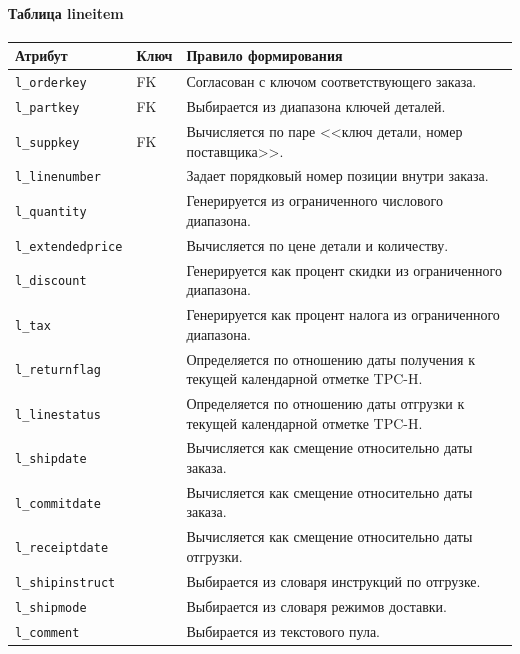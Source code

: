 \paragraph{Таблица lineitem}
\begin{center}
\small
\begin{tabular}{|p{}|p{}|p{}|}
\hline
\textbf{Атрибут} & \textbf{Ключ} & \textbf{Правило формирования} \\
\hline
\texttt{l\_orderkey} & FK & Согласован с ключом соответствующего заказа. \\
\hline
\texttt{l\_partkey} & FK & Выбирается из диапазона ключей деталей. \\
\hline
\texttt{l\_suppkey} & FK & Вычисляется по паре <<ключ детали, номер поставщика>>. \\
\hline
\texttt{l\_linenumber} &  & Задает порядковый номер позиции внутри заказа. \\
\hline
\texttt{l\_quantity} &  & Генерируется из ограниченного числового диапазона. \\
\hline
\texttt{l\_extendedprice} &  & Вычисляется по цене детали и количеству. \\
\hline
\texttt{l\_discount} &  & Генерируется как процент скидки из ограниченного диапазона. \\
\hline
\texttt{l\_tax} &  & Генерируется как процент налога из ограниченного диапазона. \\
\hline
\texttt{l\_returnflag} &  & Определяется по отношению даты получения к текущей календарной отметке TPC-H. \\
\hline
\texttt{l\_linestatus} &  & Определяется по отношению даты отгрузки к текущей календарной отметке TPC-H. \\
\hline
\texttt{l\_shipdate} &  & Вычисляется как смещение относительно даты заказа. \\
\hline
\texttt{l\_commitdate} &  & Вычисляется как смещение относительно даты заказа. \\
\hline
\texttt{l\_receiptdate} &  & Вычисляется как смещение относительно даты отгрузки. \\
\hline
\texttt{l\_shipinstruct} &  & Выбирается из словаря инструкций по отгрузке. \\
\hline
\texttt{l\_shipmode} &  & Выбирается из словаря режимов доставки. \\
\hline
\texttt{l\_comment} &  & Выбирается из текстового пула. \\
\hline
\end{tabular}
\end{center}

